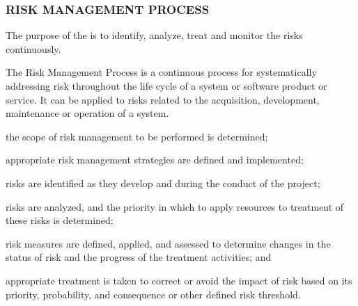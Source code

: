 		\newpage
		\subsubsection{RISK MANAGEMENT PROCESS\label{proc:risk_management_process}}

			\begin{adjustwidth}{2em}{0pt} 
				
				The purpose of the  is to identify, analyze, treat and monitor the risks continuously.

				The Risk Management Process is a continuous process for systematically addressing risk throughout the life cycle of a system or software product or service. It can be applied to risks related to the acquisition, development, maintenance or operation of a system.

			\end{adjustwidth}

			\begin{adjustwidth}{2em}{0pt} 

				\begin{compactitem}

					\item the scope of risk management to be performed is determined;

					\item appropriate risk management strategies are defined and implemented;

					\item risks are identified as they develop and during the conduct of the project;

					\item risks are analyzed, and the priority in which to apply resources to treatment of these risks is determined;

					\item risk measures are defined, applied, and assessed to determine changes in the status of risk and the progress of the treatment activities; and

					\item appropriate treatment is taken to correct or avoid the impact of risk based on its priority, probability, and consequence or other defined risk threshold.

				\end{compactitem}

			\end{adjustwidth}

